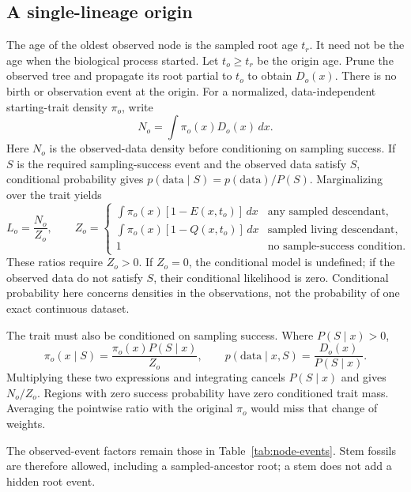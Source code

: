 \documentclass[11pt]{article}
\begin{document}
\subsection{A single-lineage origin}
The age of the oldest observed node is the sampled root age $t_r$. It need not be the age
when the biological process started. Let $t_o\geq t_r$ be the origin age. Prune the observed tree and
propagate its root partial to $t_o$ to obtain $D_o(x)$. There is no birth or observation event at
the origin. For a normalized, data-independent starting-trait density $\pi_o$, write
\begin{equation}\label{eq:origin-numerator}
 N_o=\int \pi_o(x)D_o(x)\,dx.
\end{equation}
Here $N_o$ is the observed-data density before conditioning on sampling success.
If $S$ is the required sampling-success event and the observed data satisfy $S$, conditional
probability gives $p(\text{data}\mid S)=p(\text{data})/P(S)$. Marginalizing over the trait yields
\begin{equation}\label{eq:origin-condition}
 L_o=\frac{N_o}{Z_o},\qquad
 Z_o=\begin{cases}
 \int\pi_o(x)[1-E(x,t_o)]\,dx & \text{any sampled descendant},\\
 \int\pi_o(x)[1-Q(x,t_o)]\,dx & \text{sampled living descendant},\\
 1 & \text{no sample-success condition}.
 \end{cases}
\end{equation}
These ratios require $Z_o>0$. If $Z_o=0$, the conditional model is undefined; if the observed
data do not satisfy $S$, their conditional likelihood is zero. Conditional probability here
concerns densities in the observations, not the probability of one exact continuous dataset.

The trait must also be conditioned on sampling success. Where $P(S\mid x)>0$,
\[
 \pi_o(x\mid S)=\frac{\pi_o(x)P(S\mid x)}{Z_o},\qquad
 p(\mathrm{data}\mid x,S)=\frac{D_o(x)}{P(S\mid x)}.
\]
Multiplying these two expressions and integrating cancels $P(S\mid x)$ and gives $N_o/Z_o$.
Regions with zero success probability have zero conditioned trait mass.
Averaging the pointwise ratio with the original $\pi_o$ would miss that change of weights.

The observed-event factors remain those in Table~\ref{tab:node-events}. Stem fossils are
therefore allowed, including a sampled-ancestor root; a stem does not add a hidden root event.
\end{document}
